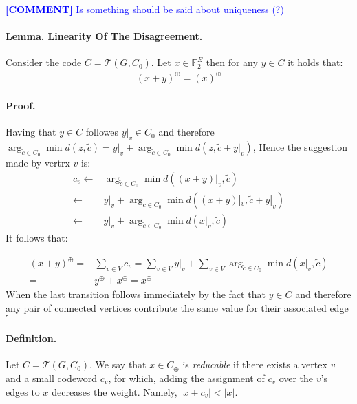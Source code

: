 \documentclass{article}
\newcommand{\commentt}[1]{\textcolor{blue}{ \textbf{[COMMENT]} #1}}
\newcommand{\ctt}[1]{\commentt{#1}}
\newcommand{ \Tann } {  \mathcal{T}\left( G, C_0 \right) }
\begin{document}
\begin{multicols*}{2}
  \ctt{ Is something should be said about uniqueness (?) } 

  \paragraph{Lemma. Linearity Of The Disagreement.} Consider the code $C = \Tann$. Let $ x \in \mathbb{F}_{2}^{E}$ then for any $ y \in C$ it holds that: 
  \begin{equation*}
    \begin{split}
      \left( x + y  \right)^{\oplus} = \left( x  \right)^{\oplus} 
    \end{split}
  \end{equation*}
  \paragraph{Proof.} Having that $y \in C$ followes $y|_v \in C_{0}$ and therefore $\arg_{ \tilde{c} \in C_{0}} \min{ d( z  , \tilde{c} ) } = y|_{v} + \arg_{ \tilde{c} \in C_{0}} \min{ d( z, \tilde{c} + y|_{v} ) } $, Hence the suggestion made by vertrx $v$ is: 
  \begin{equation*}
    \begin{split}
      c_{v}\leftarrow &  \arg_{ \tilde{c} \in C_{0}} \min{ d( (x+y)|_{v}  , \tilde{c} ) } \\
      \leftarrow &  y|_{v} +  \arg_{ \tilde{c} \in C_{0}} \min{ d( (x+y)|_{v}  , \tilde{c} + y|_{v} ) } \\
      \leftarrow &  y|_{v} +  \arg_{ \tilde{c} \in C_{0}} \min{ d( x|_{v} , \tilde{c} ) } 
    \end{split}
  \end{equation*}
  It follows that: 

  \begin{equation*}
    \begin{split}
      \left( x + y \right)^{\oplus} =& \sum_{v\in V}{c_{v}} = \sum_{v \in V}{y|_{v}} + \sum_{v\in V}{ \arg_{ \tilde{c} \in C_{0}} \min{ d( x|_{v} , \tilde{c} ) } } \\ 
      =& y^{\oplus} + x^{\oplus} = x^{\oplus}
    \end{split}
  \end{equation*}
  When the last transition follows immediately by the fact that $y \in C$ and therefore any pair of connected vertices contribute the same value for their associated edge $\square$

  \paragraph{Definition.} Let $C = \Tann$. We say that $x \in C_{\oplus}$ is \textit{reducable} if there exists a vertex $v$ and a small codeword $c_v$, for which, adding the assignment of $c_v$ over the $v$'s edges to $x$ decreases the weight. Namely, $|x + c_{v}| < |x|$. 


\end{multicols*}
\end{document}
